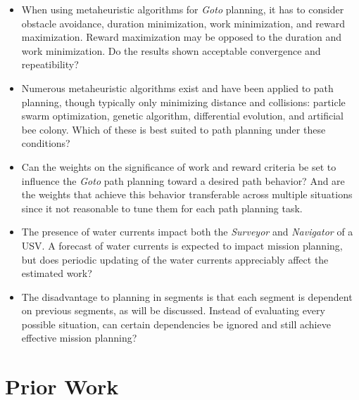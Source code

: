 \documentclass{tamuccthesis}
\begin{document}
\begin{itemize}
    \item When using metaheuristic algorithms for \textit{Goto} planning, it has to consider obstacle avoidance, duration minimization, work minimization, and reward maximization. Reward maximization may be opposed to the duration and work minimization. Do the results shown acceptable convergence and repeatibility?

    \item Numerous metaheuristic algorithms exist and have been applied to path planning, though typically only minimizing distance and collisions: particle swarm optimization, genetic algorithm, differential evolution, and artificial bee colony. Which of these is best suited to path planning under these conditions?

    \item Can the weights on the significance of work and reward criteria be set to influence the \textit{Goto} path planning toward a desired path behavior? And are the weights that achieve this behavior transferable across multiple situations since it not reasonable to tune them for each path planning task. 

    \item The presence of water currents impact both the \textit{Surveyor} and \textit{Navigator} of a USV. A forecast of water currents is expected to impact mission planning, but does periodic updating of the water currents appreciably affect the estimated work? 
    
    \item The disadvantage to planning in segments is that each segment is dependent on previous segments, as will be discussed. Instead of evaluating every possible situation, can certain dependencies be ignored and still achieve effective mission planning?
    
\end{itemize}

\section{Prior Work}
\end{document}
